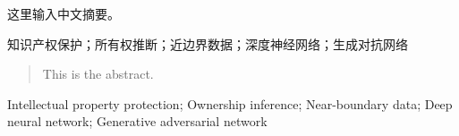 

\begin{zhaiyao}

这里输入中文摘要。
\end{zhaiyao}




\begin{guanjianci}
知识产权保护；所有权推断；近边界数据；深度神经网络；生成对抗网络
\end{guanjianci}



\begin{abstract}


This is the abstract.

\end{abstract}



\begin{keywords}
Intellectual property protection; Ownership inference; Near-boundary data; Deep neural network; Generative adversarial network
\end{keywords} 